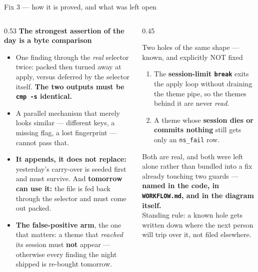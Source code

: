 \documentclass[aspectratio=169,11pt]{beamer}
\newcommand{\good}[1]{\textcolor{jsAccent}{\textbf{#1}}}
\newcommand{\mut}[1]{\textcolor{jsMute}{#1}}
\begin{document}
\begin{frame}{Fix 3 --- how it is proved, and what was left open}
  \footnotesize
  \begin{columns}[T]
    \begin{column}{0.53\textwidth}
      \textbf{The strongest assertion of the day is a byte comparison}
      \begin{itemize}
        \item One finding through the \emph{real} selector twice: packed then turned away at apply, versus deferred by the selector itself. \good{The two outputs must be \texttt{cmp -s} identical.}
        \item A parallel mechanism that merely looks similar --- different keys, a missing flag, a lost fingerprint --- cannot pass that.
        \item \textbf{It appends, it does not replace:} yesterday's carry-over is seeded first and must survive. And \textbf{tomorrow can use it:} the file is fed back through the selector and must come out packed.
        \item \textbf{The false-positive arm}, the one that matters: a theme that \emph{reached} its session must \textbf{not} appear --- otherwise every finding the night shipped is re-bought tomorrow.
      \end{itemize}
    \end{column}
    \begin{column}{0.45\textwidth}
      \begin{block}{Two holes of the same shape --- known, and explicitly NOT fixed}
        \scriptsize
        \begin{enumerate}
          \item The \textbf{session-limit \texttt{break}} exits the apply loop without draining the theme pipe, so the themes behind it are never \emph{read}.
          \item A theme whose \textbf{session dies or commits nothing} still gets only an \texttt{ns\_fail} row.
        \end{enumerate}
      \end{block}
      \vspace{0.4em}
      Both are real, and both were left alone rather than bundled into a fix already touching two guards --- \good{named in the code, in \texttt{WORKFLOW.md}, and in the diagram itself.}
      \vspace{0.4em}\\
      \mut{Standing rule: a known hole gets written down where the next person will trip over it, not filed elsewhere.}
    \end{column}
  \end{columns}
\end{frame}
\end{document}

